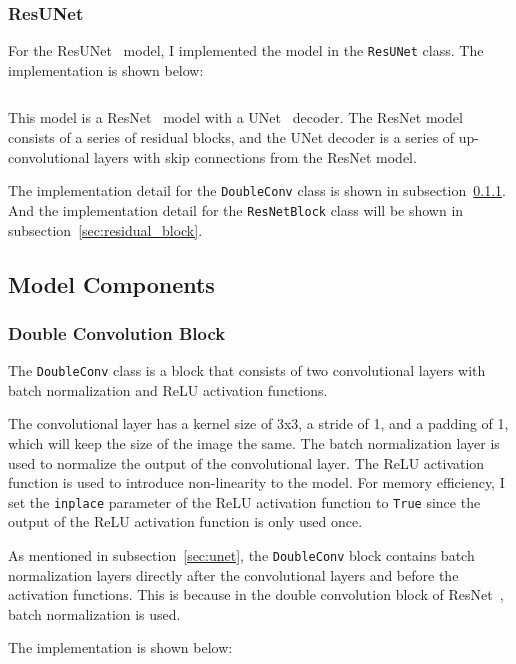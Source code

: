 \subsubsection{ResUNet}

For the ResUNet~\cite{ResUNet} model, I implemented the model in the \texttt{ResUNet} class. The implementation is shown below:

\inputminted[firstline=23]{python}{../src/models/resnet34_unet.py}

This model is a ResNet~\cite{ResNet} model with a UNet~\cite{UNet} decoder.
The ResNet model consists of a series of residual blocks, and the UNet decoder is a series of up-convolutional layers with skip connections from the ResNet model.

The implementation detail for the \texttt{DoubleConv} class is shown in subsection~\ref{sec:double_conv}.
And the implementation detail for the \texttt{ResNetBlock} class will be shown in subsection~\ref{sec:residual_block}.

\subsection{Model Components}

\subsubsection{Double Convolution Block}
\label{sec:double_conv}

The \texttt{DoubleConv} class is a block that consists of two convolutional layers with batch normalization and ReLU activation functions.

The convolutional layer has a kernel size of 3x3, a stride of 1, and a padding of 1, which will keep the size of the image the same.
The batch normalization layer is used to normalize the output of the convolutional layer.
The ReLU activation function is used to introduce non-linearity to the model.
For memory efficiency, I set the \texttt{inplace} parameter of the ReLU activation function to \texttt{True} since the output of the ReLU activation function is only used once.

As mentioned in subsection~\ref{sec:unet}, the \texttt{DoubleConv} block contains batch normalization layers directly after the convolutional layers and before the activation functions.
This is because in the double convolution block of ResNet~\cite{ResNet}, batch normalization is used.

The implementation is shown below:

